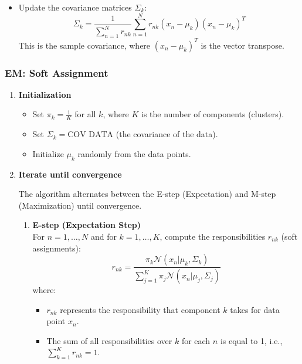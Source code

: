 \begin{definition}
\begin{enumerate}
\begin{itemize}
\begin{itemize}
                \item Update the covariance matrices \( \Sigma_k \):
                \[
                \Sigma_k = \frac{1}{\sum_{n=1}^{N} r_{nk}} \sum_{n=1}^{N} r_{nk} (x_n - \mu_k)(x_n - \mu_k)^T
                \]
                This is the sample covariance, where \( (x_n - \mu_k)^T \) is the vector transpose.
            \end{itemize}
        \end{itemize}
    \end{enumerate}
\end{definition}

\subsubsection{EM: Soft Assignment}
\begin{definition}
    \begin{enumerate}
        \item \textbf{Initialization}
        \begin{itemize}
            \item Set \( \pi_k = \frac{1}{K} \) for all \( k \), where \( K \) is the number of components (clusters).
            \item Set \( \Sigma_k = \text{COV DATA} \) (the covariance of the data).
            \item Initialize \( \mu_k \) randomly from the data points.
        \end{itemize}
    
        \item \textbf{Iterate until convergence}
    
        The algorithm alternates between the E-step (Expectation) and M-step (Maximization) until convergence.
    
        \begin{enumerate}
            \item \textbf{E-step (Expectation Step)} \\
            For \( n = 1, \dots, N \) and for \( k = 1, \dots, K \), compute the responsibilities \( r_{nk} \) (soft assignments):
            \[
            r_{nk} = \frac{\pi_k \mathcal{N}(x_n | \mu_k, \Sigma_k)}{\sum_{j=1}^{K} \pi_j \mathcal{N}(x_n | \mu_j, \Sigma_j)}
            \]
            where:
            \begin{itemize}
                \item \( r_{nk} \) represents the responsibility that component \( k \) takes for data point \( x_n \).
                \item The sum of all responsibilities over \( k \) for each \( n \) is equal to 1, i.e., \( \sum_{k=1}^{K} r_{nk} = 1 \).
            \end{itemize}
    

\end{enumerate}
\end{enumerate}
\end{definition}
